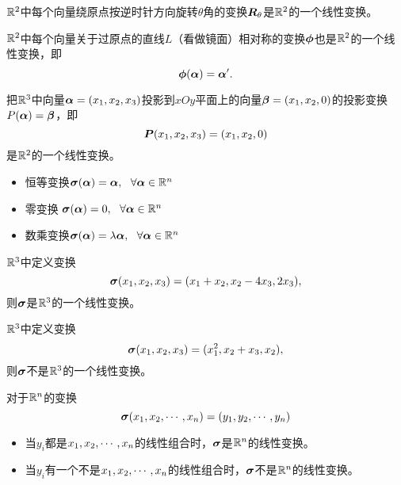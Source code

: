 \begin{frame}
  \begin{li}[旋转变换]
    $\mathbb R^2$中每个向量绕原点按逆时针方向旋转$\theta$角的变换$\boldsymbol{R}_\theta$是$\mathbb R^2$的一个线性变换。
  \end{li} \vspace{.1in} 

  \begin{li}[镜像变换]
    $\mathbb R^2$中每个向量关于过原点的直线$L$（看做镜面）相对称的变换$\boldsymbol{\phi}$也是$\mathbb R^2$的一个线性变换，即
    $$
    \boldsymbol{\phi}(\boldsymbol{\alpha})=\boldsymbol{\alpha}^\prime.
    $$
  \end{li} \vspace{.1in}

  \begin{li}[投影变换]
    把$\mathbb R^3$中向量$\boldsymbol{\alpha}=(x_1,x_2,x_3)$投影到$xOy$平面上的向量$\boldsymbol{\beta}=(x_1,x_2,0)$的投影变换$P(\boldsymbol{\alpha})=\boldsymbol{\beta}$，即
    $$
    \boldsymbol{P}(x_1,x_2,x_3)=(x_1,x_2,0)
    $$
    是$\mathbb R^2$的一个线性变换。
  \end{li} \vspace{.1in}

  \begin{li}
    \begin{itemize}
    \item 恒等变换$\boldsymbol{\sigma}(\boldsymbol{\alpha})=\boldsymbol{\alpha}, ~~\forall \boldsymbol{\alpha}\in\mathbb R^n$
    \item 零变换 $\boldsymbol{\sigma}(\boldsymbol{\alpha})=0, ~~\forall \boldsymbol{\alpha}\in\mathbb R^n$
    \item 数乘变换$\boldsymbol{\sigma}(\boldsymbol{\alpha})=\lambda\boldsymbol{\alpha}, ~~\forall \boldsymbol{\alpha}\in\mathbb R^n$
    \end{itemize}
  \end{li}
\end{frame}

\begin{frame}
  \begin{li}
    $\mathbb R^3$中定义变换
    $$
    \boldsymbol{\sigma}(x_1,x_2,x_3)=(x_1+x_2,x_2-4x_3,2x_3),
    $$
    则$\boldsymbol{\sigma}$是$\mathbb R^3$的一个线性变换。
  \end{li}\vspace{.1in}

  \begin{li}
    $\mathbb R^3$中定义变换
    $$
    \boldsymbol{\sigma}(x_1,x_2,x_3)=(x_1^2,x_2+x_3,x_2),
    $$
    则$\boldsymbol{\sigma}$不是$\mathbb R^3$的一个线性变换。
  \end{li}
\end{frame}

\begin{frame}
  对于$\mathbb R^n$的变换
  $$
  \boldsymbol{\sigma}(x_1,x_2,\cdots,x_n)=(y_1,y_2,\cdots,y_n)
  $$
  \begin{itemize}
  \item 当$y_i$都是$x_1,x_2,\cdots,x_n$的线性组合时，$\boldsymbol{\sigma}$是$\mathbb R^n$的线性变换。\\[0.1in]
  \item 当$y_i$有一个不是$x_1,x_2,\cdots,x_n$的线性组合时，$\boldsymbol{\sigma}$不是$\mathbb R^n$的线性变换。 
  \end{itemize}
\end{frame}



